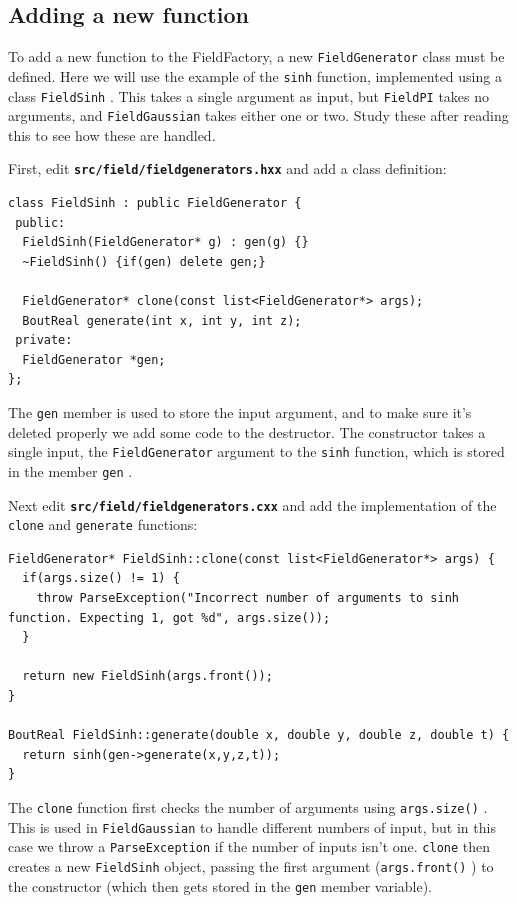 \documentclass[12pt]{article}
\newcommand{\file}[1]{\texttt{\bf #1}}
\begin{document}
\subsection{Adding a new function}
%
To add a new function to the FieldFactory, a new
%
\lstinline!FieldGenerator!
%
 class must be defined. Here we will use the example of the
%
\lstinline!sinh!
%
 function, implemented using a class
%
\lstinline!FieldSinh!
%
. This takes a single argument as input, but
%
\lstinline!FieldPI! takes no arguments, and \lstinline!FieldGaussian!
%
 takes either one or two.  Study these after reading this to see how these are
 handled.

First, edit \file{src/field/fieldgenerators.hxx} and add a class definition:
%
\begin{lstlisting}[firstnumber=114]
class FieldSinh : public FieldGenerator {
 public:
  FieldSinh(FieldGenerator* g) : gen(g) {}
  ~FieldSinh() {if(gen) delete gen;}

  FieldGenerator* clone(const list<FieldGenerator*> args);
  BoutReal generate(int x, int y, int z);
 private:
  FieldGenerator *gen;
};
\end{lstlisting}
%
The
%
\lstinline!gen!
%
 member is used to store the input argument, and to make sure it's deleted
 properly we add some code to the destructor. The constructor takes a single
 input, the
%
\lstinline!FieldGenerator! argument to the \lstinline!sinh! function, which is
stored in the member \lstinline!gen!
%
.

Next edit \file{src/field/fieldgenerators.cxx} and add the implementation of the
%
\lstinline!clone!
%
 and
%
\lstinline!generate!
%
 functions:
%
\begin{lstlisting}[firstnumber=33]
FieldGenerator* FieldSinh::clone(const list<FieldGenerator*> args) {
  if(args.size() != 1) {
    throw ParseException("Incorrect number of arguments to sinh function. Expecting 1, got %d", args.size());
  }

  return new FieldSinh(args.front());
}

BoutReal FieldSinh::generate(double x, double y, double z, double t) {
  return sinh(gen->generate(x,y,z,t));
}
\end{lstlisting}
%
The
%
\lstinline!clone! function first checks the number of arguments using
\lstinline!args.size()!
%
. This is used in
%
\lstinline!FieldGaussian!
%
 to handle different numbers of input, but in this case we throw a
%
\lstinline!ParseException!
%
if the number of inputs isn't one. \lstinline!clone!
%
 then creates a new
%
\lstinline!FieldSinh! object, passing the first argument
(\lstinline!args.front()!
%
) to the constructor (which then gets stored in the
%
\lstinline!gen!
%
 member variable).
\end{document}
